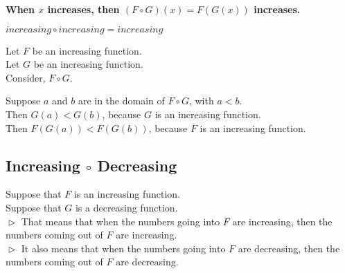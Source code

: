 \documentclass{ximera}
\begin{document}
\begin{center}
\textbf{\textcolor{red!70!black}{When $x$ increases, then $(F \circ G)(x) = F(G(x))$ increases.}}
\end{center}






\begin{fact}
$increasing \circ increasing = increasing$


Let $F$ be an increasing function. \\
Let $G$ be an increasing function. \\


Consider, $F \circ G$.

Suppose $a$ and $b$ are in the domain of $F \circ G$, with $a < b$. \\

Then $G(a) < G(b)$, because $G$ is an increasing function. \\

Then $F(G(a)) < F(G(b))$, because $F$ is an increasing function.


\end{fact}























\subsection*{Increasing $\circ$ Decreasing}


Suppose that $F$ is an increasing function. \\
Suppose that $G$ is a decreasing function. \\


$\vartriangleright$ That means that when the numbers going into $F$ are increasing, then the numbers coming out of $F$ are increasing. \\

$\vartriangleright$ It also means that when the numbers going into $F$ are decreasing, then the numbers coming out of $F$ are decreasing. \\
\end{document}
